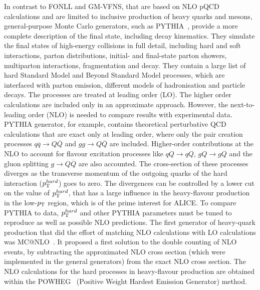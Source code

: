 In contrast to FONLL and GM-VFNS, that are based on NLO 
pQCD calculations and are limited to inclusive production
of heavy quarks and mesons, general-purpose Monte Carlo 
generators, such as PYTHIA~\cite{Sjostrand:2006za}, provide a more complete description 
of the final state, including decay kinematics. They simulate the 
final states of high-energy collisions in full detail, including hard and 
soft interactions, parton distributions, initial- and final-state parton 
showers, multiparton interactions, fragmentation and decay. They contain a large 
list of hard Standard Model and Beyond Standard Model processes, 
which are interfaced with parton emission, different models of hadronisation and particle decays. 
The processes are treated at leading order (LO). The higher order 
calculations are included only in an
approximate approach. However, the next-to-leading order (NLO) 
is needed to compare results with experimental data.
PYTHIA generator, for example, contains 
theoretical perturbative QCD calculations that are exact only
at leading order, where only the pair creation processes 
$q\overline{q} \rightarrow Q\overline{Q}$ and $gg \rightarrow Q\overline{Q}$
are included. Higher-order contributions at the NLO to account 
for flavour excitation processes like $qQ \rightarrow qQ$, $gQ \rightarrow gQ$
and the gluon splitting $g \rightarrow Q\overline{Q}$ are also accounted. 
The cross-section of these processes 
diverges as the transverse momentum of the outgoing quarks of the 
hard interaction ($p_{\rm T}^{hard}$) goes to zero. 
The divergences can be controlled by a lower cut 
on the value of  $p_{\rm T}^{hard}$, that has a large influence in the 
heavy-flavour production 
in the low-$p_{\rm T}$ region, which is of the prime interest for ALICE. 
To compare PYTHIA to data, $p_{\rm T}^{hard}$ and
other PYTHIA parameters must be tuned to reproduce as well 
as possible NLO predictions.
The first generator of heavy-quark production that did the effort of matching NLO calculations 
with LO calculations was MC@NLO~\cite{Frixione:2002ik}.
It proposed a first solution to the double counting of NLO events, 
by subtracting the approximated 
NLO cross section (which were implemented in the general generators)
 from the exact NLO cross section.
The NLO calculations for the hard processes in heavy-flavour production are obtained within the 
POWHEG~\cite{Frixione:2007nw} (Positive Weight Hardest Emission Generator) method. 

